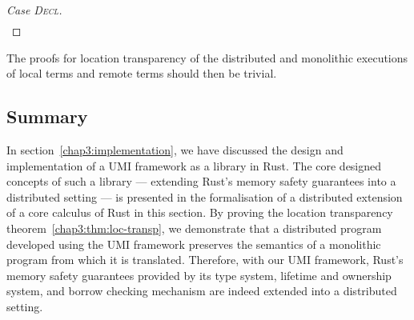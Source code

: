 \begin{proof}[Case \textsc{\emph{Decl}}]
\begin{gather*}
\end{gather*}
\end{proof}
The proofs for location transparency of the distributed and monolithic executions of local terms and remote terms should then be trivial.

\subsection{Summary}
\label{chap3:semantics:summary}
In section~\ref{chap3:implementation}, we have discussed the design and implementation of a UMI framework as a library in Rust. The core designed concepts of such a library --- extending Rust's memory safety guarantees into a distributed setting --- is presented in the formalisation of a distributed extension of a core calculus of Rust in this section. By proving the location transparency theorem~\ref{chap3:thm:loc-transp}, we demonstrate that a distributed program developed using the UMI framework preserves the semantics of a monolithic program from which it is translated. Therefore, with our UMI framework, Rust's memory safety guarantees provided by its type system, lifetime and ownership system, and borrow checking mechanism are indeed extended into a distributed setting.


